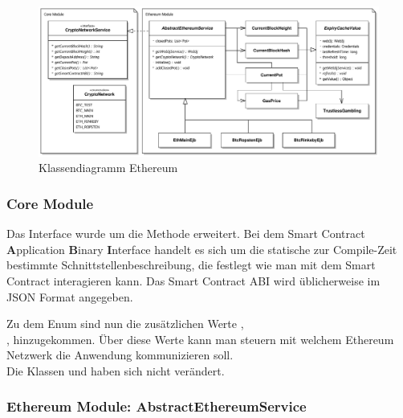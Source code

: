 \begin{figure}[H]
\centering
\includegraphics[width=1\linewidth]{Figures/umsetzung_eth/eth_business_logic1}
\decoRule
\caption{Klassendiagramm Ethereum}
\label{fig:eth_business_logic1}
\end{figure}

\subsubsection{Core Module}
Das  Interface wurde um die Methode  erweitert. Bei dem  Smart Contract \textbf{A}pplication \textbf{B}inary \textbf{I}nterface handelt es sich um die statische zur Compile-Zeit bestimmte Schnittstellenbeschreibung, die festlegt wie man mit dem Smart Contract interagieren kann. Das Smart Contract ABI wird üblicherweise im JSON Format angegeben.

Zu dem  Enum sind nun die zusätzlichen Werte ,\\,  hinzugekommen. Über diese Werte kann man steuern mit welchem Ethereum Netzwerk die Anwendung kommunizieren soll.\\
Die Klassen  und  haben sich nicht verändert.
\subsubsection{Ethereum Module: AbstractEthereumService}

